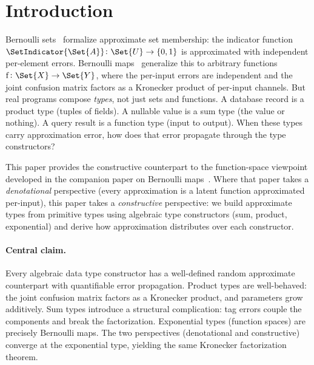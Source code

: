 \documentclass[ ../main.tex]{subfiles}
\begin{document}
\section{Introduction}
\label{sec:intro}

Bernoulli sets~\cite{bernoulliSets} formalize approximate set membership: the indicator function $\SetIndicator{\Set{A}} \colon \Set{U} \to \{0,1\}$ is approximated with independent per-element errors.
Bernoulli maps~\cite{bernoulliMaps} generalize this to arbitrary functions $\Fun{f} \colon \Set{X} \to \Set{Y}$, where the per-input errors are independent and the joint confusion matrix factors as a Kronecker product of per-input channels.
But real programs compose \emph{types}, not just sets and functions.
A database record is a product type (tuples of fields).
A nullable value is a sum type (the value or nothing).
A query result is a function type (input to output).
When these types carry approximation error, how does that error propagate through the type constructors?

This paper provides the constructive counterpart to the function-space viewpoint developed in the companion paper on Bernoulli maps~\cite{bernoulliMaps}.
Where that paper takes a \emph{denotational} perspective (every approximation is a latent function approximated per-input), this paper takes a \emph{constructive} perspective: we build approximate types from primitive types using algebraic type constructors (sum, product, exponential) and derive how approximation distributes over each constructor.

\paragraph{Central claim.}
Every algebraic data type constructor has a well-defined random approximate counterpart with quantifiable error propagation.
Product types are well-behaved: the joint confusion matrix factors as a Kronecker product, and parameters grow additively.
Sum types introduce a structural complication: tag errors couple the components and break the factorization.
Exponential types (function spaces) are precisely Bernoulli maps.
The two perspectives (denotational and constructive) converge at the exponential type, yielding the same Kronecker factorization theorem.
\end{document}
